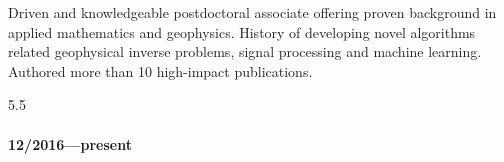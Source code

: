 \documentclass[9pt]{developercv} %
\begin{document}
\vspace{0.5cm}



\begin{minipage}[t]{0.4\textwidth} %
	\vspace{\baselineskip} %
	Driven and knowledgeable postdoctoral associate offering proven background in applied mathematics and geophysics. History of developing novel algorithms related geophysical inverse problems, signal processing and machine learning.
	Authored more than 10 high-impact publications.

\end{minipage}
\hfill %
\begin{minipage}[t]{0.5\textwidth} %
	\vspace{-\baselineskip} %
	\begin{barchart}{5.5}
	\end{barchart}
\end{minipage}

\begin{center}
\end{center}

\label{research-positions}

\paragraph{12/2016---present}\label{present}
\end{document}
